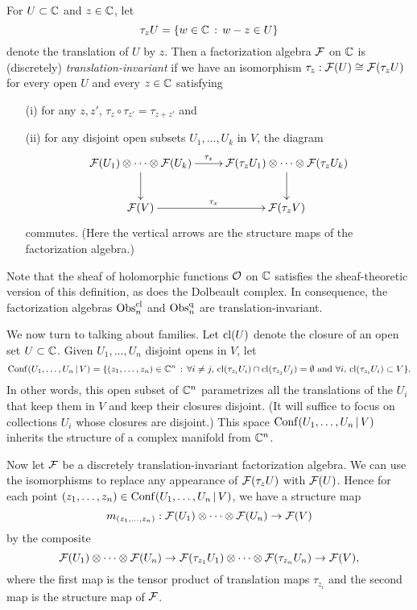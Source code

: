 \begin{dfn}
For $U \subset \mathbb C$ and $z \in \mathbb C$, let 
\[
\tau_z U = \{ w \in \mathbb C \,:\, w - z \in U \}
\]
denote the translation of $U$ by $z$. 
Then a factorization algebra $\mathcal F$ on $\mathbb C$ is (discretely) {\em translation-invariant} if we have an isomorphism
$\tau_z: \mathcal F(U) \cong \mathcal F(\tau_z U)$ for every open $U$ and every $z \in \mathbb C$ satisfying
\begin{enumerate}
\item[(i)] for any $z, z'$, $\tau_{z} \circ \tau_{z'} = \tau_{z+z'}$ and
\item[(ii)] for any disjoint open subsets $U_1,\dots, U_k$ in $V$, the diagram
\[
\xymatrix{
\cF(U_1) \otimes \dots \otimes \cF(U_k)  \ar[r]^-{\tau_z} \ar[d] &
\cF(\tau_z U_1) \otimes \dots \otimes \cF(\tau_z U_k)  \ar[d] \\
\cF(V) \ar[r]^{\tau_x} & \cF(\tau_z V)
}
\]
commutes. (Here the vertical arrows are the structure maps of the factorization algebra.) 
\end{enumerate}
\end{dfn}

Note that the sheaf of holomorphic functions $\mathcal O$ on $\mathbb C$ satisfies the sheaf-theoretic version of this definition,
as does the Dolbeault complex. 
In consequence, the factorization algebras ${\rm Obs}^{\rm cl}_n$ and ${\rm Obs}^{\rm q}_n$ are translation-invariant.

We now turn to talking about families.
Let ${\rm cl}(U)$ denote the closure of an open set $U \subset \mathbb C$.
Given $U_1,\ldots,U_n$ disjoint opens in $V$, let
\[
{\rm Conf}(U_1,\ldots,U_n \,|\, V) = \{ (z_1,\ldots,z_n) \in \mathbb C^n \,:\,\forall i \neq j ,\, {\rm cl}(\tau_{z_i} U_i) \cap  {\rm cl}(\tau_{z_j} U_j) =\emptyset \text{ and }\forall i,\, {\rm cl}(\tau_{z_i} U_i) \subset V \}.
\]
In other words, this open subset of $\mathbb C^n$ parametrizes all the translations of the $U_i$ that keep them in $V$ 
and keep their closures disjoint. (It will suffice to focus on collections $U_i$ whose closures are disjoint.)
This space ${\rm Conf}(U_1,\ldots,U_n \,|\, V)$ inherits the structure of a complex manifold from $\mathbb C^n$. 

Now let $\mathcal F$ be a discretely translation-invariant factorization algebra. 
We can use the isomorphisms to replace any appearance of $\mathcal F(\tau_z U)$ with $\mathcal F(U)$.
Hence for each point $(z_1,\ldots,z_n) \in {\rm Conf}(U_1,\ldots,U_n \,|\, V)$, we have a structure map
\[
m_{(z_1,\ldots,z_n)}: \mathcal F(U_1) \otimes \cdots \otimes \mathcal F(U_n) \to \mathcal F(V)
\]
by the composite
\[
\mathcal F(U_1) \otimes \cdots \otimes \mathcal F(U_n) \to \mathcal F(\tau_{z_1} U_1) \otimes \cdots \otimes \mathcal F(\tau_{z_n} U_n) \to \mathcal F(V),
\]
where the first map is the tensor product of translation maps $\tau_{z_i}$ and the second map is the structure map of $\mathcal F$.

